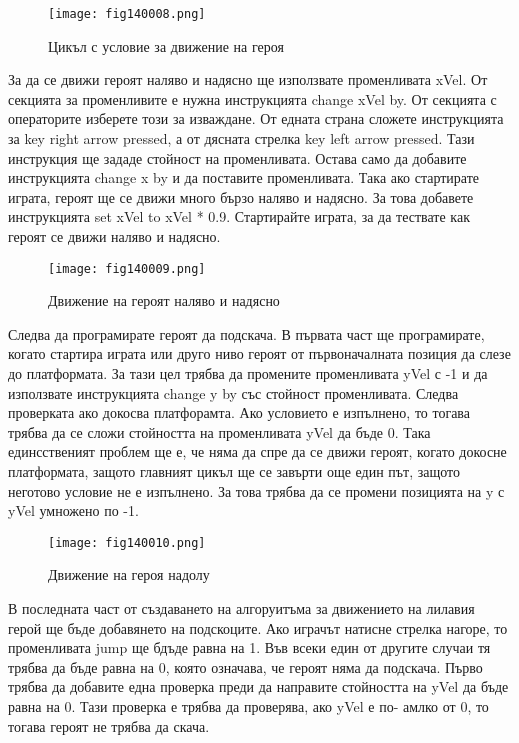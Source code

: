 \begin{figure}[H]
  \centering
  \texttt{[image: fig140008.png]}
  \caption{Цикъл с условие за движение на героя}
\label{fig140008}
\end{figure}

За да се движи героят наляво и надясно ще използвате променливата xVel. От секцията за променливите е нужна инструкцията change xVel by. От секцията с операторите изберете този за изваждане. От едната страна сложете инструкцията за key right arrow pressed, а от дясната стрелка key left arrow pressed. Тази инструкция ще зададе стойност на променливата. Остава само да добавите инструкцията change x by и да поставите променливата. Така ако стартирате играта, героят ще се движи много бързо наляво и надясно. За това добавете инструкцията set xVel to xVel * 0.9. Стартирайте играта, за да тествате как героят се движи наляво и надясно.

\begin{figure}[H]
  \centering
  \texttt{[image: fig140009.png]}
  \caption{Движение на героят наляво и надясно}
\label{fig140009}
\end{figure}

Следва да програмирате героят да подскача. В първата част ще програмирате, когато стартира играта или друго ниво героят от първоначалната позиция да слезе до платформата. За тази цел трябва да промените променливата yVel с -1 и да използвате инструкцията change y by със стойност променливата. Следва проверката ако докосва платфорамта. Ако условието е изпълнено, то тогава трябва да се сложи стойността на променливата yVel да бъде 0. Така единсственият проблем ще е, че няма да спре да се движи героят, когато докосне платформата, защото главният цикъл ще се завърти още един път, защото неготово условие не е изпълнено. За това трябва да се промени позицията на y с yVel умножено по -1.

\begin{figure}[H]
  \centering
  \texttt{[image: fig140010.png]}
  \caption{Движение на героя надолу}
\label{fig140010}
\end{figure}

В последната част от създаването на алгоруитъма за движението на лилавия герой ще бъде добавянето на подскоците. Ако играчът натисне стрелка нагоре, то променливата jump ще бдъде равна на 1. Във всеки един от другите случаи тя трябва да бъде равна на 0, която означава, че героят няма да подскача. Първо трябва да добавите една проверка преди да направите стойността на yVel да бъде равна на 0. Тази проверка е трябва да проверява, ако yVel е по- амлко от 0, то тогава героят не трябва да скача.


